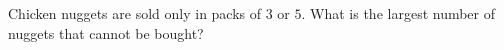 Chicken nuggets are sold only in packs of $3$ or $5$. What is the largest number of nuggets that cannot be bought?
